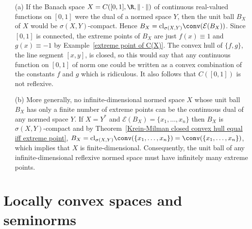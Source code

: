 \begin{example}
\mbox{}
\begin{itemize}
\item[(a)] If the Banach space $X=C([0,1],\R,\|\cdot\|)$ of continuous real-valued functions on $[0,1]$ were the dual of a normed space $Y$, then the unit ball $B_X$ of $X$ would be $\sigma(X,Y)$-compact. Hence $B_X=\mathrm{cl}_{\sigma(X,Y)}\conv(\mathcal{E}(B_X))$. Since $[0,1]$ is connected, the extreme points of $B_X$ are just $f(x)\equiv 1$ and $g(x)\equiv -1$ by Example~\ref{extreme point of C(X)}. The convex hull of $\{f,g\}$, the line segment $[x,y]$, is closed, so this would say that any continuous function on $[0,1]$ of norm one could be written as a convex combination of the constants $f$ and $g$ which is ridiculous. It also follows that $C([0,1])$ is not reflexive.
\item[(b)] More generally, no infinite-dimensional normed space $X$ whose unit ball $B_X$ has only a finite number of extreme points can be the continuous dual of any normed space $Y$. If $X=Y^*$ and $\mathcal{E}(B_X)=\{x_1,\dots,x_n\}$ then $B_X$ is $\sigma(X,Y)$-compact and by Theorem~\ref{Krein-Milman closed convex hull equal iff extreme point}, $B_X=\mathrm{cl}_{\sigma(X,Y)}\conv(\{x_1,\dots,x_n\})=\conv(\{x_1,\dots,x_n\})$, which implies that $X$ is finite-dimensional. Consequently, the unit ball of any infinite-dimensional reflexive normed space must have infinitely many extreme points.
\end{itemize}
\end{example}
\newpage
\chapter{Locally convex spaces and seminorms}
